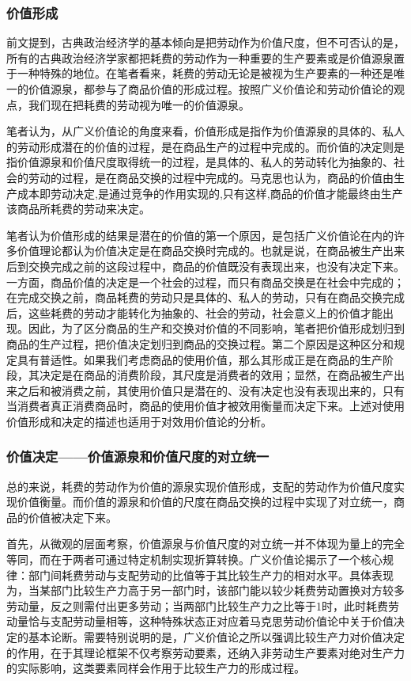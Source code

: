 \subsubsection{价值形成}

前文提到，古典政治经济学的基本倾向是把劳动作为价值尺度，但不可否认的是，所有的古典政治经济学家都把耗费的劳动作为一种重要的生产要素或是价值源泉置于一种特殊的地位。在笔者看来，耗费的劳动无论是被视为生产要素的一种还是唯一的价值源泉，都参与了商品价值的形成过程。按照广义价值论和劳动价值论的观点，我们现在把耗费的劳动视为唯一的价值源泉。

笔者认为，从广义价值论的角度来看，价值形成是指作为价值源泉的具体的、私人的劳动形成潜在的价值的过程，是在商品生产的过程中完成的。而价值的决定则是指价值源泉和价值尺度取得统一的过程，是具体的、私人的劳动转化为抽象的、社会的劳动的过程，是在商品交换的过程中完成的。马克思也认为，商品的价值由生产成本即劳动决定,是通过竞争的作用实现的,只有这样,商品的价值才能最终由生产该商品所耗费的劳动来决定\cite[3]{ZhangLeiShengMaKeSiLaoDongJieZhiLunYanJiuDeLiShiZhengTiXing2015}。 

笔者认为价值形成的结果是潜在的价值的第一个原因，是包括广义价值论在内的许多价值理论都认为价值决定是在商品交换时完成的。也就是说，在商品被生产出来后到交换完成之前的这段过程中，商品的价值既没有表现出来，也没有决定下来。一方面，商品价值的决定是一个社会的过程，而只有商品交换是在社会中完成的；在完成交换之前，商品耗费的劳动只是具体的、私人的劳动，只有在商品交换完成后，这些耗费的劳动才能转化为抽象的、社会的劳动，社会意义上的价值才能出现。因此，为了区分商品的生产和交换对价值的不同影响，笔者把价值形成划归到商品的生产过程，把价值决定划归到商品的交换过程。第二个原因是这种区分和规定具有普适性。如果我们考虑商品的使用价值，那么其形成正是在商品的生产阶段，其决定是在商品的消费阶段，其尺度是消费者的效用；显然，在商品被生产出来之后和被消费之前，其使用价值只是潜在的、没有决定也没有表现出来的，只有当消费者真正消费商品时，商品的使用价值才被效用衡量而决定下来。上述对使用价值形成和决定的描述也适用于对效用价值论的分析。

\subsubsection{价值决定——价值源泉和价值尺度的对立统一}

总的来说，耗费的劳动作为价值的源泉实现价值形成，支配的劳动作为价值尺度实现价值衡量。而价值的源泉和价值的尺度在商品交换的过程中实现了对立统一，商品的价值被决定下来。

首先，从微观的层面考察，价值源泉与价值尺度的对立统一并不体现为量上的完全等同，而在于两者可通过特定机制实现折算转换。广义价值论揭示了一个核心规律：部门间耗费劳动与支配劳动的比值等于其比较生产力的相对水平。具体表现为，当某部门比较生产力高于另一部门时，该部门能以较少耗费劳动置换对方较多劳动量，反之则需付出更多劳动；当两部门比较生产力之比等于1时，此时耗费劳动量恰与支配劳动量相等，这种特殊状态正对应着马克思劳动价值论中关于价值决定的基本论断。需要特别说明的是，广义价值论之所以强调比较生产力对价值决定的作用，在于其理论框架不仅考察劳动要素，还纳入非劳动生产要素对绝对生产力的实际影响，这类要素同样会作用于比较生产力的形成过程。

